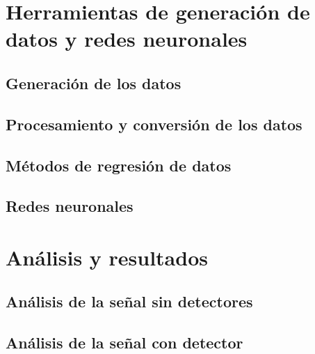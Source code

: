 \documentclass[12pt]{report}
\begin{document}

\chapter{Herramientas de generación de datos y redes neuronales}


	\section{Generación de los datos}\label{Cap_genera}
    

    \section{Procesamiento y conversión de los datos}
    
    
    \section{Métodos de regresión de datos}\label{Cap_regresion}
    
    
    \section{Redes neuronales}
    

    
	
        

\chapter{Análisis y resultados}


	\section{Análisis de la señal sin detectores}
	
	
	\section{Análisis de la señal con detector}
    
    
\end{document}
